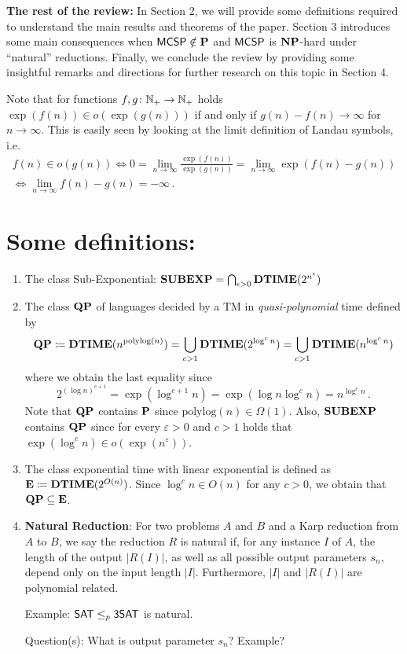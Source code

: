 \documentclass[12pt]{article}
\theoremstyle{definition}
\begin{document}
\textbf{The rest of the review:} In Section 2, we will provide some definitions required to understand the main results and theorems of the paper. Section 3 introduces some main consequences when $\mathprob{MCSP} \notin \P$ and $\mathprob{MCSP}$ is $\NP$-hard under ``natural'' reductions. Finally, we conclude the review by providing some insightful remarks and directions for further research on this topic in Section 4.

\newpage
Note that for functions $f, g \colon \N_+ \to \N_+$ holds
$\exp(f(n)) \in o(\exp(g(n)))$ if and only if $g(n) - f(n) \to \infty$ for
$n \to \infty$.
This is easily seen by looking at the limit definition of Landau symbols, i.e.
\begin{multline*}
  f(n) \in o(g(n))
  \iff
  0 = \lim_{n \to \infty} \frac{\exp(f(n))}{\exp(g(n))}
  = \lim_{n \to \infty} \exp(f(n) - g(n)) \\
  \iff
  \lim_{n \to \infty} f(n) - g(n) = -\infty \,.
\end{multline*}

\bigskip
\section{Some definitions:}
\begin{enumerate} [1.]
	\item The class Sub-Exponential: $\class{SUBEXP} = \bigcap_{\epsilon > 0} \TIME(2^{n^{\epsilon}})$

  \item The class $\class{QP}$ of languages decided by a TM in
    \emph{quasi-polynomial} time defined by
    \[
      \class{QP}
      \coloneqq
      \TIME(n^{\mathrm{polylog}(n)})
      =
      \bigcup_{c > 1}\TIME(2^{\log^c n})
      =
      \bigcup_{c > 1}\TIME(n^{\log^c n})
    \]
    where we obtain the last equality since
    \[
      2^{(\log n)^{c+1}} = \exp( \log^{c+1} n ) = \exp( \log n \log^c n )
      = n^{\log^c n} \,.
    \]
    Note that $\class{QP}$ contains $\P$ since
    $\mathrm{polylog}(n) \in \Omega(1)$.
    Also, $\class{SUBEXP}$ contains $\class{QP}$ since for every
    $\varepsilon > 0$ and $c > 1$ holds that
    $\exp(\log^c n) \in o(\exp(n^\varepsilon))$.

	\item The class exponential time with linear exponential is defined as
    $\class{E} \coloneqq \TIME(2^{O(n)})$.
    Since $\log^c n \in O(n)$ for any $c > 0$, we obtain that
    $\class{QP} \subseteq \class E$.
	
	\item \textbf{Natural Reduction}: For two problems $A$ and $B$ and a Karp reduction from $A$ to $B$, we say the reduction $R$ is natural if, for any instance $I$ of $A$, the length of the output $|R(I)|$, as well as all possible output parameters $s_n$, depend only on the input length $|I|$. Furthermore, $|I|$ and $|R(I)|$ are polynomial related.
	
	Example: $\mathprob{SAT} \leq_p \mathprob{3SAT}$ is natural. 
	
	Question(s): What is output parameter $s_n$? Example?
\end{enumerate}
\end{document}
